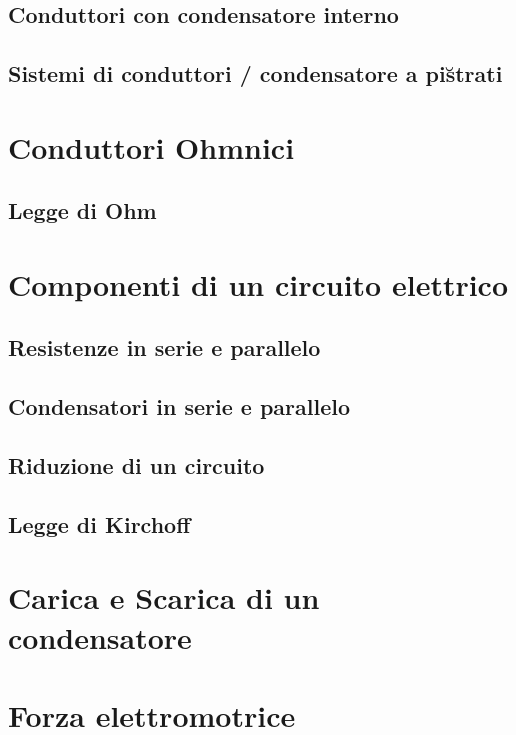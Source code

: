 \subsection{Conduttori con condensatore interno}
\subsection{Sistemi di conduttori / condensatore a pi\u strati}
\section{Conduttori Ohmnici}
\subsection{Legge di Ohm}

\section{Componenti di un circuito elettrico}
\subsection{Resistenze in serie e parallelo}
\subsection{Condensatori in serie e parallelo}
\subsection{Riduzione di un circuito}
\subsection{Legge di Kirchoff}

\section{Carica e Scarica di un condensatore}
\section{Forza elettromotrice}


